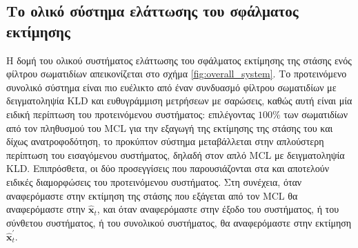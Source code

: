 \subsection{Το ολικό σύστημα ελάττωσης του σφάλματος εκτίμησης}
\label{subsection:02_02_03:04}

Η δομή του ολικού συστήματος ελάττωσης του σφάλματος εκτίμησης της στάσης ενός
φίλτρου σωματιδίων απεικονίζεται στο σχήμα \ref{fig:overall_system}.  Το
προτεινόμενο συνολικό σύστημα είναι πιο ευέλικτο από έναν συνδυασμό φίλτρου
σωματιδίων με δειγματοληψία KLD και ευθυγράμμιση μετρήσεων με σαρώσεις, καθώς
αυτή είναι μία ειδική περίπτωση του προτεινόμενου συστήματος: επιλέγοντας
$100\%$ των σωματιδίων από τον πληθυσμού του MCL για την εξαγωγή της εκτίμησης
της στάσης του και δίχως ανατροφοδότηση, το προκύπτον σύστημα μεταβάλλεται στην
απλούστερη περίπτωση του εισαγόμενου συστήματος, δηλαδή στον απλό MCL με
δειγματοληψία KLD. Επιπρόσθετα, οι δύο προσεγγίσεις που παρουσιάζονται στα
\cite{Vasiljevic2016a} και \cite{Peng2018a} αποτελούν ειδικές διαμορφώσεις του
προτεινόμενου συστήματος. Στη συνέχεια, όταν αναφερόμαστε στην εκτίμηση της
στάσης που εξάγεται από τον MCL θα αναφερόμαστε στην $\hat{\bm{x}}_t$, και όταν
αναφερόμαστε στην έξοδο του συστήματος, ή του σύνθετου συστήματος, ή του
συνολικού συστήματος, θα αναφερόμαστε στην εκτίμηση $\hat{\bm{x}}^{\prime}_t$.

